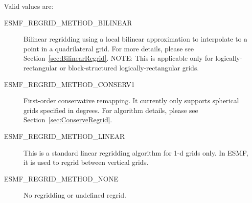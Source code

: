 Valid values are:
\begin{description}

\item [ESMF\_REGRID\_METHOD\_BILINEAR]
     Bilinear regridding using a local bilinear approximation to interpolate
     to a point in a quadrilateral grid.  For more details, please see
     Section~\ref{sec:BilinearRegrid}.  NOTE: This is applicable only for
     logically-rectangular or block-structured logically-rectangular grids.

\item[ESMF\_REGRID\_METHOD\_CONSERV1]
     First-order conservative remapping. It currently only supports spherical 
     grids specified in degrees.  For algorithm details, please see
     Section~\ref{sec:ConserveRegrid}.

\item[ESMF\_REGRID\_METHOD\_LINEAR  ]
     This is a standard linear regridding algorithm for 1-d grids only.  In ESMF,
     it is used to regrid between vertical grids.

\item [ESMF\_REGRID\_METHOD\_NONE]
     No regridding or undefined regrid.
\end{description}



